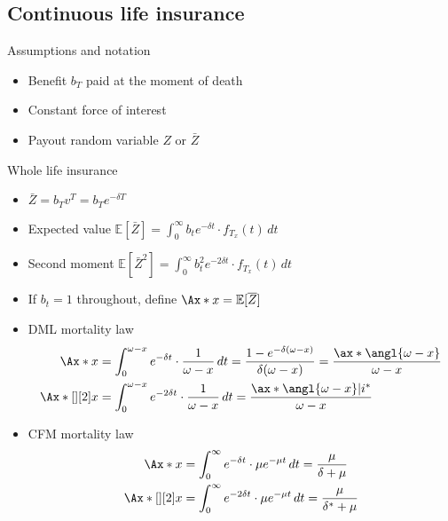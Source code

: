 \subsection{Continuous life insurance}

Assumptions and notation
\begin{itemize}
\item Benefit $b_T$ paid at the moment of death
\item Constant force of interest
\item Payout random variable $Z$ or $\bar{Z}$
\end{itemize}

Whole life insurance
\begin{itemize}
\item $\bar{Z} = b_Tv^T = b_Te^{-\delta T}$
\item Expected value $\mathbb{E}[\bar{Z}] = \int_0^{\infty} b_te^{-\delta t}\cdot f_{T_x}(t)\,dt$
\item Second moment $\mathbb{E}[\bar{Z}^2] = \int_0^{\infty} b_t^2e^{-2\delta t}\cdot f_{T_x}(t)\,dt$
\item If $b_t = 1$ throughout, define $\Ax*{x} = \mathbb{E}[\bar{Z}]$
\item DML mortality law
\begin{align*}
\Ax*{x} &= \int_0^{\omega - x} e^{-\delta t}\cdot\frac{1}{\omega - x}\,dt = \frac{1 - e^{-\delta(\omega - x)}}{\delta(\omega - x)} = \frac{\ax*{\angl{\omega - x}}}{\omega - x} \\
\Ax*[][2]{x} &= \int_0^{\omega - x} e^{-2\delta t}\cdot\frac{1}{\omega - x}\,dt = \frac{\ax*{\angl{\omega - x}|i^{*}}}{\omega - x}
\end{align*}
\item CFM mortality law
\begin{align*}
\Ax*{x} &= \int_0^{\infty} e^{-\delta t}\cdot \mu e^{-\mu t}\,dt = \frac{\mu}{\delta + \mu} \\
\Ax*[][2]{x} &= \int_0^{\infty} e^{-2\delta t}\cdot \mu e^{-\mu t}\,dt = \frac{\mu}{\delta^{*} + \mu}
\end{align*}
\end{itemize}


